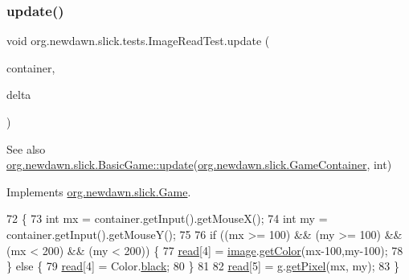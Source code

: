 \mbox{\label{classorg_1_1newdawn_1_1slick_1_1tests_1_1_image_read_test_a20aafb02e7bcbcedd1f7dc60bd1753dc}} 
\subsubsection{\texorpdfstring{update()}{update()}}
{\footnotesize\ttfamily void org.\+newdawn.\+slick.\+tests.\+Image\+Read\+Test.\+update (\begin{DoxyParamCaption}\item[{\mbox{\hyperlink{classorg_1_1newdawn_1_1slick_1_1_game_container}{Game\+Container}}}]{container,  }\item[{int}]{delta }\end{DoxyParamCaption})\hspace{0.3cm}{\ttfamily [inline]}}

\begin{DoxySeeAlso}{See also}
\mbox{\hyperlink{classorg_1_1newdawn_1_1slick_1_1_basic_game_acfe6fa05aef83bff1631af91a3e4bd20}{org.\+newdawn.\+slick.\+Basic\+Game\+::update}}(\mbox{\hyperlink{classorg_1_1newdawn_1_1slick_1_1_game_container}{org.\+newdawn.\+slick.\+Game\+Container}}, int) 
\end{DoxySeeAlso}


Implements \mbox{\hyperlink{interfaceorg_1_1newdawn_1_1slick_1_1_game_ab07b2e9463ee4631620dde0de25bdee8}{org.\+newdawn.\+slick.\+Game}}.


\begin{DoxyCode}
72                                                            \{
73         \textcolor{keywordtype}{int} mx = container.getInput().getMouseX();
74         \textcolor{keywordtype}{int} my = container.getInput().getMouseY();
75         
76         \textcolor{keywordflow}{if} ((mx >= 100) && (my >= 100) && (mx < 200) && (my < 200)) \{
77             \mbox{\hyperlink{classorg_1_1newdawn_1_1slick_1_1tests_1_1_image_read_test_ab0721babf247ba03bc83a35f2a3091bd}{read}}[4] = \mbox{\hyperlink{classorg_1_1newdawn_1_1slick_1_1tests_1_1_image_read_test_ae9727db5ef94831ba4684e9cc8faa5c3}{image}}.\mbox{\hyperlink{classorg_1_1newdawn_1_1slick_1_1_image_ab3b87f64ff6c9c413a7f0a016ba0693c}{getColor}}(mx-100,my-100);
78         \} \textcolor{keywordflow}{else} \{
79             \mbox{\hyperlink{classorg_1_1newdawn_1_1slick_1_1tests_1_1_image_read_test_ab0721babf247ba03bc83a35f2a3091bd}{read}}[4] = Color.\mbox{\hyperlink{classorg_1_1newdawn_1_1slick_1_1_color_ac9ec721980ab1c388e82e2f8e584f002}{black}};
80         \}
81         
82         \mbox{\hyperlink{classorg_1_1newdawn_1_1slick_1_1tests_1_1_image_read_test_ab0721babf247ba03bc83a35f2a3091bd}{read}}[5] = \mbox{\hyperlink{classorg_1_1newdawn_1_1slick_1_1tests_1_1_image_read_test_a13250d14a7e738e60c94a62d6b55c566}{g}}.\mbox{\hyperlink{classorg_1_1newdawn_1_1slick_1_1_graphics_ad338ae801f15815df18bd3ac38bf6b19}{getPixel}}(mx, my);
83     \}
\end{DoxyCode}


